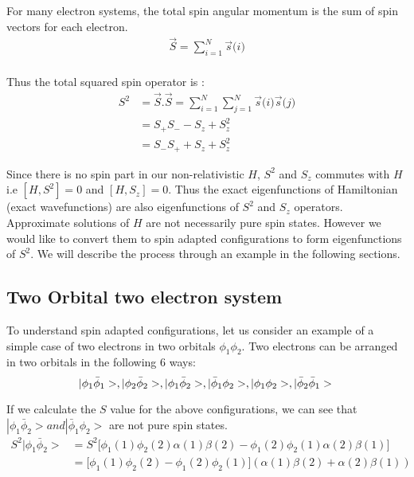 \documentclass[11pt]{article}   	%
\begin{document}
	For many electron systems, the total spin angular momentum is the sum of spin vectors for each 
	electron.\\
	\begin{equation}
	\begin{split}
		\vec{S}=\sum_{i=1}^N \vec{s}\big(i\big)\\
	\end{split}
	\end{equation}	
	
	Thus the total squared spin operator is :\\
	\begin{equation}
	\begin{split}
		S^2 &=\vec{S} .\vec{S}=\sum_{i=1}^N \sum_{j=1}^N \vec{s}\big(i\big)\vec{s}\big(j\big)\\
			&=S_+S_--S_z+S_z^2\\
			&=S_-S_++S_z+S_z^2
	\end{split}
	\end{equation}
	
	Since there is no spin part in our non-relativistic $H$, $S^2$ and $S_z$ commutes with $H$ 
	i.e $[H,S^2]=0$	and $[H,S_z]=0$. Thus the exact eigenfunctions of Hamiltonian (exact wavefunctions) 
	are also eigenfunctions of $S^2$ and $S_z$ operators.\\ 
	
	Approximate solutions of $H$ are not necessarily pure spin states. However we would like to convert
	them to spin adapted configurations to form eigenfunctions of $S^2$. We will describe the process 
	through an example in the following sections. \\
	

	\subsection{Two Orbital two electron system}
	To understand spin adapted configurations, let us consider an example of a simple case of two electrons in two 
	orbitals $\phi_1 \phi_2$. Two electrons can be arranged in two orbitals in the following 6 ways: \\
	\begin{equation}
		|\phi_1\bar{\phi}_1>, |\phi_2\bar{\phi}_2>, |\phi_1\bar{\phi}_2>, |\bar{\phi}_1\phi_2>, |\phi_1\phi_2>, |\bar{\phi}_2\bar{\phi}_1>\\ 
	\end{equation}
	
	If we calculate the $S$ value for the above configurations, we can see that $|\phi_1\bar{\phi}_2>
	and  |\bar{\phi}_1\phi_2>$ are not pure spin states. \\
	\begin{equation}
	\begin{split}
	S^2|\phi_1\bar{\phi}_2>&=S^2\big[\phi_1(1)\phi_2(2)\alpha(1) \beta(2)-\phi_1(2)\phi_2(1)\alpha(2) \beta(1)\big]\\
		&=\big[\phi_1(1)\phi_2(2)-\phi_1(2)\phi_2(1)\big](\alpha(1) \beta(2)+\alpha(2)\beta(1))
	\end{split}
	\end{equation}
	
\end{document}
